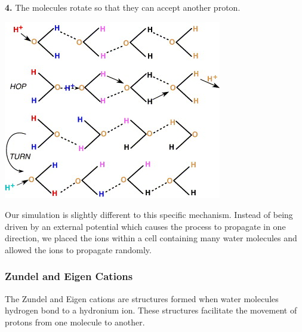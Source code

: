 \documentclass{article}
\newenvironment{Figure}{\par\medskip\noindent\minipage{\linewidth}}{\endminipage\par\medskip}
\begin{document}
\begin{multicols}{2}
\textbf{4.} The molecules rotate so that they can accept another proton.
\begin{Figure}
	\includegraphics[width=\textwidth]{figures/ProtonHopping.jpg}
	\label{fig:GrotthussDiagram}	
\end{Figure}

Our simulation is slightly different to this specific mechanism. Instead of being driven by an external potential which causes the process to propagate in one direction, we placed the ions within a cell containing many water molecules and allowed the ions to propagate randomly.

\subsubsection{Zundel and Eigen Cations}
\label{sec:cations}
The Zundel and Eigen cations are structures formed when water molecules hydrogen bond to a hydronium ion. These structures facilitate the movement of protons from one molecule to another.


\end{multicols}
\end{document}
